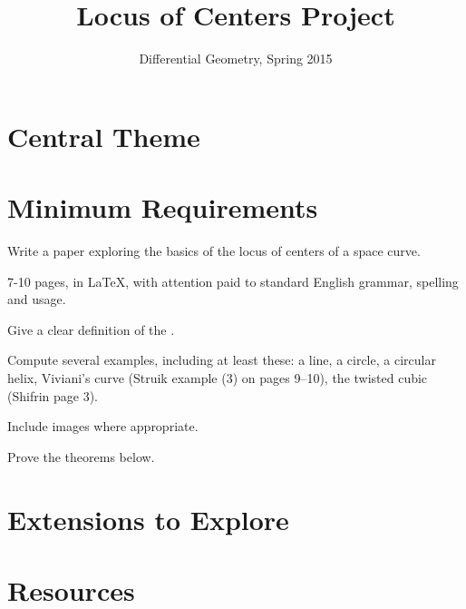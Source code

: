 \documentclass[12pt]{amsart}
\begin{document}
\title{Locus of Centers Project}
\author{Differential Geometry, Spring 2015}

\maketitle

\section*{Central Theme}

\section*{Minimum Requirements}

Write a paper exploring the basics of the locus of centers of a space curve.
\begin{compactitem}
\item 7-10 pages, in \LaTeX, with attention paid to standard English grammar, spelling and usage.
\item Give a clear definition of the .
\item Compute several examples, including at least these: a line, a circle, a circular helix, Viviani's curve (Struik example (3) on pages 9--10), the twisted cubic (Shifrin page 3).
\item Include images where appropriate.
\item Prove the theorems below.
\end{compactitem}


\section*{Extensions to Explore}


\section*{Resources}
\end{document}
